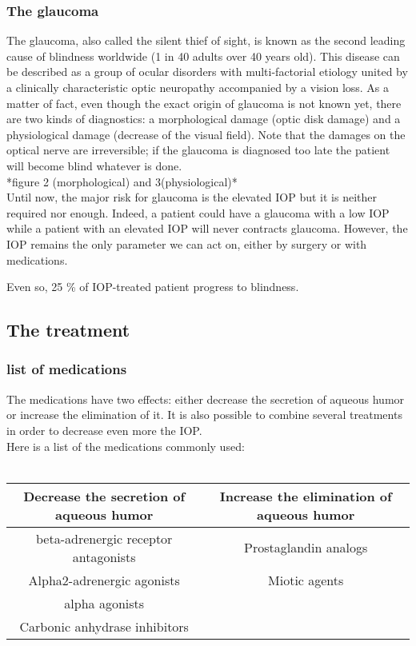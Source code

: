 \documentclass[english,12pt]{article}
\numberwithin{equation}{section}
\begin{document}
\subsubsection{The glaucoma}
The glaucoma, also called the silent thief of sight, is known as the second leading cause of blindness worldwide (1 in 40 adults over 40 years old). This disease can be described as a group of ocular disorders with multi-factorial etiology united by a clinically characteristic optic neuropathy accompanied by a vision loss. As a matter of fact, even though the exact origin of glaucoma is not known yet, there are two kinds of diagnostics: a morphological damage (optic disk damage) and a physiological damage (decrease of the visual field). Note that the damages on the optical nerve are irreversible; if the glaucoma is diagnosed too late the patient will become blind whatever is done.\\
*figure 2 (morphological) and 3(physiological)*\\
Until now, the major risk for glaucoma is the elevated IOP but it is neither required nor enough. Indeed, a patient could have a glaucoma with a low IOP while a patient with an elevated IOP will never contracts glaucoma. However, the IOP remains the only parameter we can act on, either by surgery or with medications. 

Even so, 25 \% of IOP-treated patient progress to blindness.

\subsection{The treatment}
\subsubsection{list of medications}
The medications have two effects: either decrease the secretion of aqueous humor or increase the elimination of it. It is also possible to combine several treatments in order to decrease even more the IOP.\\
Here is a list of the medications commonly used:\\
\\
\begin{tabular}{|c|c|}
\hline
Decrease the secretion of aqueous humor & Increase the elimination of aqueous humor\\
\hline
beta-adrenergic receptor antagonists & Prostaglandin analogs \\
Alpha2-adrenergic agonists & Miotic agents \\
alpha agonists &  \\
Carbonic anhydrase inhibitors &  \\

\hline
\end{tabular}
\end{document}
